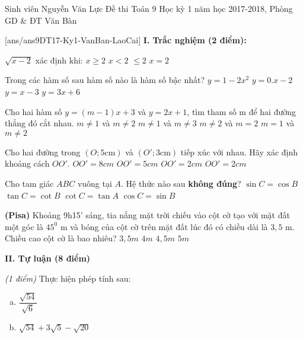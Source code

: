 
\begin{name}
{Sinh viên Nguyễn Văn Lực}
{Đề thi Toán 9 Học kỳ 1 năm học 2017-2018, Phòng GD \& ĐT Văn Bàn}
\end{name}
\setcounter{ex}{0}
[ans/ans9DT17-Ky1-VanBan-LaoCai]
\textbf{I. Trắc nghiệm (2 điểm):} \\
\begin{ex}%
$\sqrt{x-2}$ xác định khi: 
\choice 
{\True $x\ge 2$}
{$x<2$}
{$\le 2$}
{$x=2$}
\loigiai{

}
\end{ex}
\begin{ex}%
Trong các hàm số sau hàm số nào là hàm số bậc nhất?
\choice
{$y=1-2x^2$}
{$y=0.x-2$}
{\True $y=x-3$}
{\True $y=3x+6$}
\loigiai{}
\end{ex}
\begin{ex}%
Cho hai hàm số $y=(m-1)x+3$ và $y=2x+1$, tìm tham số m để hai đường thẳng đó cắt nhau. \choice
{$m \neq 1$ và $m \neq 2$}
{\True $m \neq 1$ và $m \neq 3$}
{$m \neq 2$ và $m = 2$}
{$m = 1$ và $m \neq 2$}
\loigiai{}
\end{ex}
\begin{ex}%
Cho hai đường trong $(O;5 \text{cm})$ và $(O';3 \text{cm})$ tiếp xúc với nhau. Hãy xác định khoảng cách $OO'$. 
\choice
{\True $OO'=8cm$}
{$OO'=5 cm$}
{\True $OO'=2cm$}
{$OO'=2 cm$}
\end{ex}
\begin{ex}%
Cho tam giác $ABC$ vuông tại $A$. Hệ thức nào sau \textbf{không đúng}?
\choice 
{$\sin C=\cos B$}
{$\tan C=\cot B$}
{\True $\cot C=\tan A$}
{$\cos C=\sin B$}
\loigiai{}
\end{ex}
\begin{ex}%
\textbf{(Pisa)} 	Khoảng 9h15' sáng, tia nắng mặt trời chiếu vào cột cờ tạo với mặt đất một góc là $45^0$ m và bóng của cột cờ trên mặt đất lúc đó có chiều dài là $3,5$ m. Chiều cao cột cờ là bao nhiêu?
\choice
{\True $3,5m$}
{$4m$}
{$4,5m$}
{$5m$}
\loigiai{}
\end{ex}
\textbf{II. Tự luận (8 điểm)}	
\begin{ex}\textit{(1 điểm)}%
Thực hiện phép tính sau:
\begin{enumerate}[a. ]
\item $\dfrac{\sqrt{54}}{\sqrt6}$
\item $\sqrt{54}+3\sqrt5-\sqrt{20}$ 
\end{enumerate}
\end{ex}
